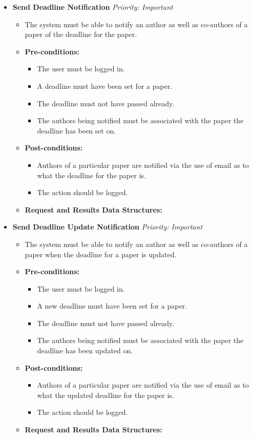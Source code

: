 \documentclass{article}
\begin{document}
				\begin{itemize}
					\item \textbf{Send Deadline Notification} \hfill \textit{Priority: Important}
					\begin{itemize}
						\item The system must be able to notify an author as well as co-authors of a paper of the deadline for the paper.
						\item \textbf{Pre-conditions:}
						\begin{itemize}
							\item The user must be logged in.
							\item A deadline must have been set for a paper.
							\item The deadline must not have passed already.
							\item The authors being notified must be associated with the paper the deadline has been set on.
						\end{itemize}
						\item \textbf{Post-conditions:}
						\begin{itemize}
							\item Authors of a particular paper are notified via the use of email as to what the deadline for the paper is.
							\item The action should be logged.
						\end{itemize}
						\item \textbf{Request and Results Data Structures:}
					\end{itemize}
					
					\item \textbf{Send Deadline Update Notification} \hfill \textit{Priority: Important}
					\begin{itemize}
						\item The system must be able to notify an author as well as co-authors of a paper when the deadline for a paper is updated.
						\item \textbf{Pre-conditions:}
						\begin{itemize}
							\item The user must be logged in.
							\item A new deadline must have been set for a paper.
							\item The deadline must not have passed already.
							\item The authors being notified must be associated with the paper the deadline has been updated on.
						\end{itemize}
						\item \textbf{Post-conditions:}
						\begin{itemize}
							\item Authors of a particular paper are notified via the use of email as to what the updated deadline for the paper is.
							\item The action should be logged.
						\end{itemize}
						\item \textbf{Request and Results Data Structures:}
					\end{itemize}
				\end{itemize}
\end{document}
